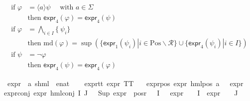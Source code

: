 \begin{isabellebody}
\begin{isamarkuptext}
\begin{align*}
    \text{if } \varphi &= \langle a \rangle \psi \quad \text{ with } a \in \Sigma \\
    & \text{then } \textsf{expr}_4(\varphi) = \textsf{expr}_4(\psi) \\
    \text{if } \varphi &= \bigwedge_{i \in I} \{\ \psi_i \} \\
    & \text{then } \text{md}(\varphi) = \sup(\{\textsf{expr}_1(\psi_i)|i\in\text{Pos}\backslash \mathcal{R}\}\cup\{\textsf{expr}_4(\psi_i) | i \in I\}) \\
    \text{if } \psi &= \neg \varphi \\
    & \text{then } \textsf{expr}_4(\psi) = \textsf{expr}_4(\varphi)
\end{align*}%
\end{isamarkuptext}\isamarkuptrue%
\isamarkupfalse%
\ expr{\isacharunderscore}{\kern0pt}{}\ {\isacharcolon}{\kern0pt}{\isacharcolon}{\kern0pt}\ {\isachardoublequoteopen}{\isacharparenleft}{\kern0pt}{\isacharprime}{\kern0pt}a{\isacharcomma}{\kern0pt}\ {\isacharprime}{\kern0pt}s{\isacharparenright}{\kern0pt}hml\ {\isasymRightarrow}\ enat{\isachardoublequoteclose}\ \isanewline
\ \ \isanewline
expr{\isacharunderscore}{\kern0pt}{}{\isacharunderscore}{\kern0pt}tt{\isacharcolon}{\kern0pt}\ {\isachardoublequoteopen}expr{\isacharunderscore}{\kern0pt}{}\ TT\ {\isacharequal}{\kern0pt}\ {}{\isachardoublequoteclose}\ {\isacharbar}{\kern0pt}\isanewline
expr{\isacharunderscore}{\kern0pt}{}{\isacharunderscore}{\kern0pt}pos{\isacharcolon}{\kern0pt}\ {\isachardoublequoteopen}expr{\isacharunderscore}{\kern0pt}{}\ {\isacharparenleft}{\kern0pt}hml{\isacharunderscore}{\kern0pt}pos\ a\ {\isasymphi}{\isacharparenright}{\kern0pt}\ {\isacharequal}{\kern0pt}\ expr{\isacharunderscore}{\kern0pt}{}\ {\isasymphi}{\isachardoublequoteclose}\ {\isacharbar}{\kern0pt}\isanewline
expr{\isacharunderscore}{\kern0pt}{}{\isacharunderscore}{\kern0pt}conj{\isacharcolon}{\kern0pt}\ {\isachardoublequoteopen}expr{\isacharunderscore}{\kern0pt}{}\ {\isacharparenleft}{\kern0pt}hml{\isacharunderscore}{\kern0pt}conj\ I\ J\ {\isasymPhi}{\isacharparenright}{\kern0pt}\ {\isacharequal}{\kern0pt}\ Sup\ {\isacharparenleft}{\kern0pt}{\isacharparenleft}{\kern0pt}expr{\isacharunderscore}{\kern0pt}{}\ {\isacharbackquote}{\kern0pt}\ {\isacharparenleft}{\kern0pt}pos{\isacharunderscore}{\kern0pt}r\ {\isacharparenleft}{\kern0pt}{\isasymPhi}\ {\isacharbackquote}{\kern0pt}\ I{\isacharparenright}{\kern0pt}{\isacharparenright}{\kern0pt}{\isacharparenright}{\kern0pt}\ \ {\isasymunion}\ {\isacharparenleft}{\kern0pt}expr{\isacharunderscore}{\kern0pt}{}\ {\isasymcirc}\ {\isasymPhi}{\isacharparenright}{\kern0pt}\ {\isacharbackquote}{\kern0pt}\ I\ {\isasymunion}\ {\isacharparenleft}{\kern0pt}expr{\isacharunderscore}{\kern0pt}{}\ {\isasymcirc}\ {\isasymPhi}{\isacharparenright}{\kern0pt}\ {\isacharbackquote}{\kern0pt}\ J{\isacharparenright}{\kern0pt}{\isachardoublequoteclose}%

\end{isabellebody}
